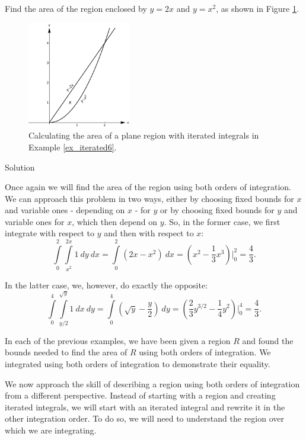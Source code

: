 \begin{example}\label{ex_iterated6}
Find the area of the region enclosed by $y=2x$ and $y=x^2$, as shown in Figure \ref{fig_multiple_3}. 



\begin{figure}[H]
	\begin{center}
			\includegraphics[width=0.4\textwidth]{fig_multiple_3}
	\caption{Calculating the area of a plane region with iterated integrals in Example \ref{ex_iterated6}.}
	\label{fig_multiple_3}
	\end{center}
\end{figure}

Solution 

Once again we will find the area of the region using both orders of integration. We can approach this problem in two ways, either by choosing  fixed bounds for $x$ and variable ones - depending on $x$ - for $y$ or by choosing fixed bounds for $y$ and variable ones for $x$, which then depend on $y$. So, in the former case, we first integrate with respect to $y$ and then with respect to $x$:
$$\int\limits_0^2\int\limits_{x^2}^{2x}1\ dy \ dx = \int\limits_0^2(2x-x^2)\ dx = \left(x^2-\frac13x^3\right)\Bigg|_0^2 = \frac43.$$

In the latter case, we, however, do exactly the opposite:
$$\int\limits_0^4\int\limits_{y/2}^{\sqrt{y}} 1\ dx\ dy = \int\limits_0^4 \left(\sqrt{y}-\dfrac{y}{2} \right)\ dy = \left(\frac23y^{3/2} - \frac14y^2\right)\Big|_0^4 = \frac43.$$
\end{example}


In each of the previous examples, we have been given a region $R$ and found the bounds needed to find the area of $R$ using both orders of integration. We integrated using both orders of integration to demonstrate their equality.

We now approach the skill of describing a region using both orders of integration from a different perspective. Instead of starting with a region and creating iterated integrals, we will start with an iterated integral and rewrite it in the other integration order. To do so, we will need to understand the region over which we are integrating.

